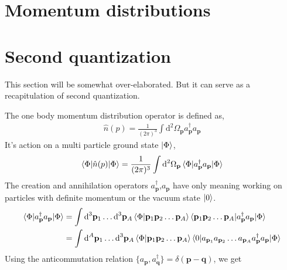 \documentclass[10pt]{article}
\begin{document}
\section{Momentum distributions}
\section{Second quantization}
This section will be somewhat over-elaborated. But it can serve as a recapitulation of second quantization.

The one body momentum distribution operator is defined as,
\begin{align}
	\hat{n}(p) = \frac{1}{(2 \pi)^{3}} \int \textrm{d}^{2} \Omega_{\mathbf{p}} a_{\mathbf{p}}^{\dagger} a_{\mathbf{p}}
\end{align}
It's action on a multi particle ground state $\ket{\Phi}$,
\begin{align}
	\braket{ \Phi | \hat{n}(p) | \Phi} = \frac{1}{(2 \pi)^{3}} \int \textrm{d}^{2} \Omega_{\mathbf{p}} \braket{ \Phi | a_{\mathbf{p}}^{\dagger} a_{\mathbf{p}} | \Phi}
\end{align}
The creation and annihilation operators $a_{\mathbf{p}}^{\dagger}$,$a_{\mathbf{p}}$ have only meaning working on particles with definite momentum or the vacuum state $\ket{0}$.
\begin{align}
	\braket{ \Phi | a_{\mathbf{p}}^{\dagger} a_{\mathbf{p}} | \Phi} &= \int \textrm{d}^{3} \mathbf{p}_{1} \ldots \textrm{d}^{3} \mathbf{p}_{A} \braket {\Phi | \mathbf{p}_1 \mathbf{p}_2 \ldots \mathbf{p}_{A}} \braket{ \mathbf{p}_{1} \mathbf{p}_{2} \ldots \mathbf{p}_{A} | a_{\mathbf{p}}^{\dagger} a_{\mathbf{p}} | \Phi } \\
	&= \int \textrm{d}^{A} \mathbf{p}_{1} \ldots \textrm{d}^{3} \mathbf{p}_{A} \braket {\Phi | \mathbf{p}_1 \mathbf{p}_2 \ldots \mathbf{p}_{A}} \braket{ 0 | a_{\mathbf{p}_{1}} a_{\mathbf{p}_{2}} \ldots a_{\mathbf{p}_{A}} a_{\mathbf{p}}^{\dagger} a_{\mathbf{p}} | \Phi } 
\end{align}
Using the anticommutation relation $\{ a_{\mathbf{p}} ,a_{\mathbf{q}}^{\dagger} \} = \delta(\mathbf{p}-\mathbf{q})$, we get
\end{document}
